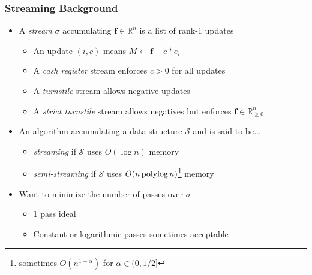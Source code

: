 \documentclass{beamer}
\newcommand{\polylog}{\, \textnormal{polylog} \,}
\begin{document}

\begin{frame}
\frametitle{Streaming Background}

\begin{itemize}
	\item A \emph{stream} $\sigma$ accumulating $\mathbf{f} \in \mathbb{R}^{n}$ is a list of rank-1 updates
	\begin{itemize}
		\item An update $(i,c)$ means $M \gets \mathbf{f} + c*e_i$
		\item A \emph{cash register} stream enforces $c > 0$ for all updates
		\item A \emph{turnstile} stream allows negative updates
		\item A \emph{strict turnstile} stream allows negatives but enforces $\mathbf{f} \in \mathbb{R}^{n}_{\geq 0}$
	\end{itemize}
	\item An algorithm accumulating a data structure $\mathcal{S}$ and is said to be...
	\begin{itemize}
		\item \emph{streaming} if $\mathcal{S}$ uses $O(\log n)$ memory
		\item \emph{semi-streaming} if $\mathcal{S}$ uses $O(n \polylog n)$\footnote{sometimes $O(n^{1+\alpha})$ for $\alpha \in (0,1/2]$} memory
	\end{itemize}
	\item Want to minimize the number of passes over $\sigma$	
	\begin{itemize}
		\item 1 pass ideal
		\item Constant or logarithmic passes sometimes acceptable 
	\end{itemize}

\end{itemize}

\end{frame}

\end{document}
